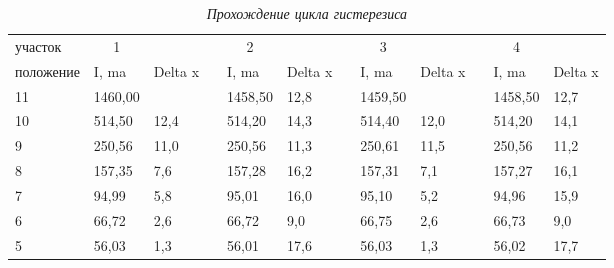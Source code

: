 \documentclass[a4paper,12pt]{article}
\begin{document}
\begin{table}[!h]
    \centering
    \caption{\textit{Прохождение цикла гистерезиса}}
    \begin{tabular}{|l|l|l|l|l|l|l|l|l|l|l|l|}
        \cline{1-3} \cline{5-6} \cline{8-9} \cline{11-12}
        участок   & \multicolumn{1}{c|}{1} &         &  & \multicolumn{1}{c|}{2} &         &  & \multicolumn{1}{c|}{3} & \multicolumn{1}{c|}{} &  & \multicolumn{1}{c|}{4} &         \\ \cline{1-3} \cline{5-6} \cline{8-9} \cline{11-12} 
        положение & I, ma                  & Delta x &  & I, ma                  & Delta x &  & I, ma                  & Delta x               &  & I, ma                  & Delta x \\ \cline{1-3} \cline{5-6} \cline{8-9} \cline{11-12} 
        11        & 1460,00                &         &  & 1458,50                & 12,8    &  & 1459,50                &                       &  & 1458,50                & 12,7    \\ \cline{1-3} \cline{5-6} \cline{8-9} \cline{11-12} 
        10        & 514,50                 & 12,4    &  & 514,20                 & 14,3    &  & 514,40                 & 12,0                  &  & 514,20                 & 14,1    \\ \cline{1-3} \cline{5-6} \cline{8-9} \cline{11-12} 
        9         & 250,56                 & 11,0    &  & 250,56                 & 11,3    &  & 250,61                 & 11,5                  &  & 250,56                 & 11,2    \\ \cline{1-3} \cline{5-6} \cline{8-9} \cline{11-12} 
        8         & 157,35                 & 7,6     &  & 157,28                 & 16,2    &  & 157,31                 & 7,1                   &  & 157,27                 & 16,1    \\ \cline{1-3} \cline{5-6} \cline{8-9} \cline{11-12} 
        7         & 94,99                  & 5,8     &  & 95,01                  & 16,0    &  & 95,10                  & 5,2                   &  & 94,96                  & 15,9    \\ \cline{1-3} \cline{5-6} \cline{8-9} \cline{11-12} 
        6         & 66,72                  & 2,6     &  & 66,72                  & 9,0     &  & 66,75                  & 2,6                   &  & 66,73                  & 9,0     \\ \cline{1-3} \cline{5-6} \cline{8-9} \cline{11-12} 
        5         & 56,03                  & 1,3     &  & 56,01                  & 17,6    &  & 56,03                  & 1,3                   &  & 56,02                  & 17,7    \\ \cline{1-3} \cline{5-6} \cline{8-9} \cline{11-12} 

\end{tabular}
\end{table}
\end{document}
